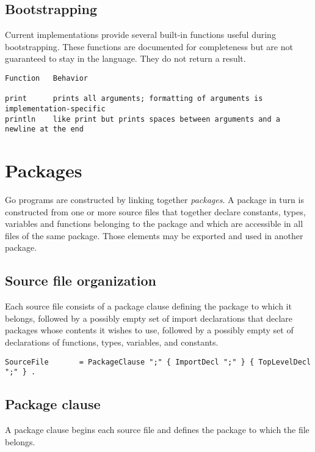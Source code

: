 \subsection*{Bootstrapping}

Current implementations provide several built-in functions useful during
bootstrapping. These functions are documented for completeness but are
not guaranteed to stay in the language. They do not return a result.

\begin{Verbatim}[frame=single]
Function   Behavior

print      prints all arguments; formatting of arguments is implementation-specific
println    like print but prints spaces between arguments and a newline at the end
\end{Verbatim}

\section*{Packages}

Go programs are constructed by linking together \emph{packages}. A
package in turn is constructed from one or more source files that
together declare constants, types, variables and functions belonging to
the package and which are accessible in all files of the same package.
Those elements may be exported and
used in another package.

\subsection*{Source file organization}

Each source file consists of a package clause defining the package to
which it belongs, followed by a possibly empty set of import
declarations that declare packages whose contents it wishes to use,
followed by a possibly empty set of declarations of functions, types,
variables, and constants.

\begin{Verbatim}[frame=single]
SourceFile       = PackageClause ";" { ImportDecl ";" } { TopLevelDecl ";" } .
\end{Verbatim}

\subsection*{Package clause}

A package clause begins each source file and defines the package to
which the file belongs.

